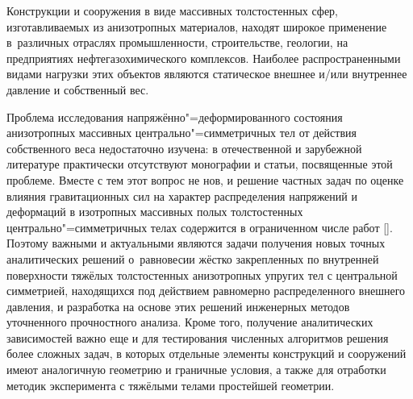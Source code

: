  Конструкции и сооружения в виде массивных
толстостенных сфер, изготавливаемых из анизотропных материалов,
находят широкое применение в~различных отраслях промышленности,
строительстве, геологии, на предприятиях нефтегазохимического
комплексов. Наиболее распространенными видами нагрузки этих объектов
являются статическое внешнее и/или внутреннее давление и собственный
вес.

Проблема исследования напряжённо"=деформированного состояния
анизотропных массивных центрально"=симметричных тел от действия
собственного веса недостаточно изучена: в отечественной и зарубежной
литературе практически отсутствуют монографии и статьи, посвященные этой
проблеме. Вместе с тем этот вопрос не нов, и решение частных задач
по оценке влияния гравитационных сил на характер распределения
напряжений и деформаций в изотропных массивных полых толстостенных
центрально"=симметричных телах содержится в ограниченном числе работ
[]. Поэтому важными и актуальными являются задачи получения новых точных аналитических решений о~равновесии жёстко закрепленных по внутренней поверхности тяжёлых
толстостенных анизотропных упругих тел с центральной симметрией,
находящихся под действием равномерно распределенного внешнего
давления, и разработка на основе этих решений инженерных методов
уточненного прочностного анализа. Кроме того, получение
аналитических зависимостей важно еще и для тестирования численных
алгоритмов решения более сложных задач, в которых отдельные элементы
конструкций и сооружений имеют аналогичную геометрию и граничные
условия, а также для отработки методик эксперимента с тяжёлыми
телами простейшей геометрии.

\smallskip


